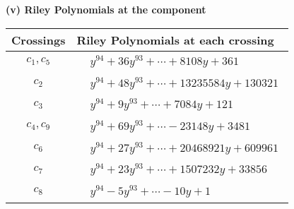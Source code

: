 \documentclass[1p]{elsarticle_modified}
\theoremstyle{definition}
\begin{document}
\newpage\renewcommand{\arraystretch}{1}
\flushleft \textbf{(v) Riley Polynomials at the component}\newline \\
\begin{tabular}{m{50pt}|m{274pt}}
Crossings & \hspace{64pt}Riley Polynomials at each crossing \\
\hline $$\begin{aligned}c_{1},c_{5}\end{aligned}$$&$\begin{aligned}
&y^{94}+36 y^{93}+\cdots+8108 y+361
\end{aligned}$\\
\hline $$\begin{aligned}c_{2}\end{aligned}$$&$\begin{aligned}
&y^{94}+48 y^{93}+\cdots+13235584 y+130321
\end{aligned}$\\
\hline $$\begin{aligned}c_{3}\end{aligned}$$&$\begin{aligned}
&y^{94}+9 y^{93}+\cdots+7084 y+121
\end{aligned}$\\
\hline $$\begin{aligned}c_{4},c_{9}\end{aligned}$$&$\begin{aligned}
&y^{94}+69 y^{93}+\cdots-23148 y+3481
\end{aligned}$\\
\hline $$\begin{aligned}c_{6}\end{aligned}$$&$\begin{aligned}
&y^{94}+27 y^{93}+\cdots+20468921 y+609961
\end{aligned}$\\
\hline $$\begin{aligned}c_{7}\end{aligned}$$&$\begin{aligned}
&y^{94}+23 y^{93}+\cdots+1507232 y+33856
\end{aligned}$\\
\hline $$\begin{aligned}c_{8}\end{aligned}$$&$\begin{aligned}
&y^{94}-5 y^{93}+\cdots-10 y+1
\end{aligned}$\\

\end{tabular}
\end{document}
